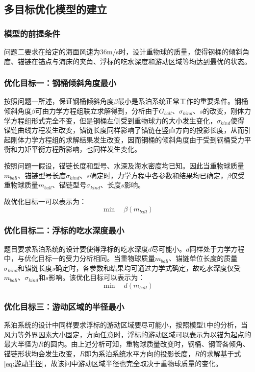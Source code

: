 \documentclass[withoutpreface,bwprint]{cumcmthesis}
\begin{document}
\subsection{多目标优化模型的建立}

\subsubsection{模型的前提条件}
问题二要求在给定的海面风速为36m/s时，设计重物球的质量，使得钢桶的倾斜角度、锚链在锚点与海床的夹角、浮标的吃水深度和游动区域等均达到最优的状态。

\subsubsection{优化目标一：钢桶倾斜角度最小}
按照问题一所述，保证钢桶倾斜角度$\beta$最小是系泊系统正常工作的重要条件。钢桶倾斜角度$\beta$可由力学方程组联立求解得到，分析由于$G_{ball}$、$\sigma_{kind}$、$s$的改变，刚体力学方程组形式完全不变，但是钢桶左侧受到重物球力的大小发生变化，$\sigma_{kind}$使得锚链曲线方程发生改变，锚链长度同样影响了锚链在竖直方向的投影长度，从而引起刚体力学方程组的求解结果发生改变，因而钢桶的倾斜角度由于受到钢桶受力平衡和力矩平衡方程所影响，也同样发生变化。

按照问题一假设，锚链长度和型号、水深及海水密度均已知。因此当重物球质量$m_{ball}$、锚链型号长度$\sigma_{kind}$、$s$确定时，力学方程中各参数和结果均已确定，$\beta$仅受重物球质量$m_{ball}$、锚链型号$\sigma_{kind}$、长度$s$影响。

故优化目标一可以表示为：
\begin{equation}
\min \quad \beta(m_{ball})
\end{equation}

\subsubsection{优化目标二：浮标的吃水深度最小}
题目要求系泊系统的设计要使得浮标的吃水深度$d$尽可能小。$d$同样处于力学方程中，与优化目标一的受力分析相同。当重物球质量$m_{ball}$、锚链单位长度的质量$\sigma_{kind}$和锚链长度$s$确定时，各参数和结果均可通过力学式确定，故吃水深度仅受$m_{ball}$、$\sigma_{kind}$和$s$影响。该优化目标可以表示为：
\begin{equation}
\min \quad d(m_{ball})
\end{equation}

\subsubsection{优化目标三：游动区域的半径最小}
系泊系统的设计中同样要求浮标的游动区域要尽可能小，按照模型1中的分析，当风力等外界因素大小固定，方向任意时，浮标的游动区域可以表示为以锚为起点的最大半径为$R$的圆内。由上述分析可知，重物球质量改变时，钢桶、钢管各倾角、锚链形状均会发生改变，$R$即为系泊系统水平方向的投影长度，$R$的求解基于式\eqref{eq:游动半径}，故该问中游动区域半径也完全取决于重物球质量的变化。
\end{document}
